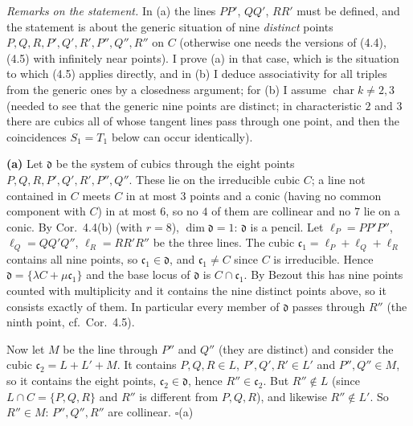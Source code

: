 \documentclass[11pt]{article}
\begin{document}
\pf
\emph{Remarks on the statement.} In (a) the lines $PP'$, $QQ'$, $RR'$ must be defined, and the statement is about the generic situation of nine \emph{distinct} points $P,Q,R,P',Q',R',P'',Q'',R''$ on $C$ (otherwise one needs the versions of (4.4), (4.5) with infinitely near points). I prove (a) in that case, which is the situation to which (4.5) applies directly, and in (b) I deduce associativity for all triples from the generic ones by a closedness argument; for (b) I assume $\operatorname{char}k\ne2,3$ (needed to see that the generic nine points are distinct; in characteristic $2$ and $3$ there are cubics all of whose tangent lines pass through one point, and then the coincidences $S_1=T_1$ below can occur identically).

\textbf{(a)} Let $\mathfrak d$ be the system of cubics through the eight points $P,Q,R,P',Q',R',P'',Q''$. These lie on the irreducible cubic $C$; a line not contained in $C$ meets $C$ in at most $3$ points and a conic (having no common component with $C$) in at most $6$, so no $4$ of them are collinear and no $7$ lie on a conic. By Cor.~4.4(b) (with $r=8$), $\dim\mathfrak d=1$: $\mathfrak d$ is a pencil. Let $\ell_P=PP'P''$, $\ell_Q=QQ'Q''$, $\ell_R=RR'R''$ be the three lines. The cubic $\mathfrak c_1=\ell_P+\ell_Q+\ell_R$ contains all nine points, so $\mathfrak c_1\in\mathfrak d$, and $\mathfrak c_1\ne C$ since $C$ is irreducible. Hence $\mathfrak d=\{\lambda C+\mu\mathfrak c_1\}$ and the base locus of $\mathfrak d$ is $C\cap\mathfrak c_1$. By Bezout this has nine points counted with multiplicity and it contains the nine distinct points above, so it consists exactly of them. In particular every member of $\mathfrak d$ passes through $R''$ (the ninth point, cf.\ Cor.~4.5).

Now let $M$ be the line through $P''$ and $Q''$ (they are distinct) and consider the cubic $\mathfrak c_2=L+L'+M$. It contains $P,Q,R\in L$, $P',Q',R'\in L'$ and $P'',Q''\in M$, so it contains the eight points, $\mathfrak c_2\in\mathfrak d$, hence $R''\in\mathfrak c_2$. But $R''\notin L$ (since $L\cap C=\{P,Q,R\}$ and $R''$ is different from $P,Q,R$), and likewise $R''\notin L'$. So $R''\in M$: $P'',Q'',R''$ are collinear. \hfill$\square$(a)
\end{document}
